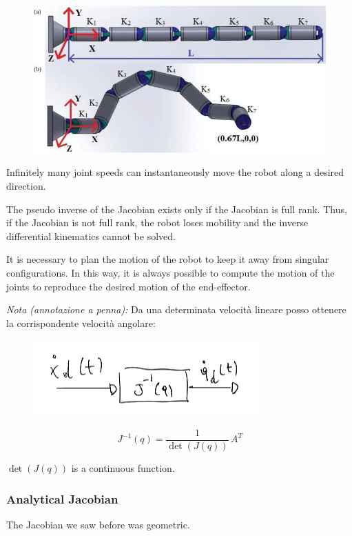 \begin{figure}[H]
    \centering
    \includegraphics[width=1\linewidth]{imgs/inverse_diff_kine.png}
\end{figure}

Infinitely many joint speeds can instantaneously move the robot along a desired direction.

The pseudo inverse of the Jacobian exists only if the Jacobian is full rank. Thus, if the Jacobian is not full rank, the robot loses mobility and the inverse differential kinematics cannot be solved.

It is necessary to plan the motion of the robot to keep it away from singular configurations. In this way, it is always possible to compute the motion of the joints to reproduce the desired motion of the end-effector.

\textit{Nota (annotazione a penna):} Da una determinata velocità lineare posso ottenere la corrispondente velocità angolare:

\begin{figure}[H]
    \centering
    \includegraphics[width=0.4\linewidth]{imgs/inv_diff_kine_speeds.png}
\end{figure}

\[
J^{-1}(q) = \frac{1}{\det(J(q))} \, A^{T}
\]

$\det(J(q))$ is a continuous function.

\subsubsection*{Analytical Jacobian}

The Jacobian we saw before was geometric.

